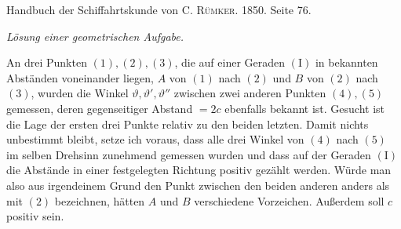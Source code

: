 \par\bigskip{}
\begin{center}Handbuch der Schiffahrtskunde von C. \textsc{Rümker}. 1850. Seite 76.\par\medskip
\textit{Lösung einer geometrischen Aufgabe.}\end{center}
\hspace*{\parindent}An drei Punkten \((1),(2),(3)\), die auf einer Geraden \(\mathrm{(I)}\) in bekannten Abständen voneinander liegen, \(A\) von \((1)\) nach \((2)\) und \(B\) von \((2)\) nach \((3)\), wurden die Winkel \(\vartheta,\vartheta',\vartheta''\) zwischen zwei anderen Punkten \((4),(5)\) gemessen, deren gegenseitiger Abstand \(=2c\) ebenfalls bekannt ist. Gesucht ist die Lage der ersten drei Punkte relativ zu den beiden letzten. Damit nichts unbestimmt bleibt, setze ich voraus, dass alle drei Winkel von \((4)\) nach \((5)\) im selben Drehsinn zunehmend gemessen wurden und dass auf der Geraden \(\mathrm{(I)}\) die Abstände in einer festgelegten Richtung positiv gezählt werden. Würde man also aus irgendeinem Grund den Punkt zwischen den beiden anderen anders als mit \((2)\) bezeichnen, hätten \(A\) und \(B\) verschiedene Vorzeichen. Außerdem soll \(c\) positiv sein.
